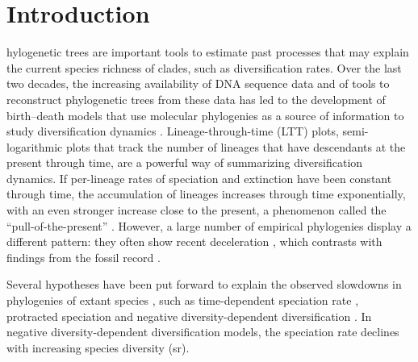 \clearpage
{ %
\renewcommand{\subsectionautorefname}{Appendix}
\section{Introduction}
\label{ch1::sec::intro}
hylogenetic trees are important tools to estimate past processes that may explain the current species richness of clades, such as diversification rates. Over the last two decades, the increasing availability of DNA sequence data and of tools to reconstruct phylogenetic trees from these data has led to the development of birth--death models that use molecular phylogenies as a source of information to study diversification dynamics \citep{nee_tempo_1992,purvis_phylogenetic_2008,quental_diversity_2010,etienne_diversity-dependence_2012}. Lineage-through-time (LTT) plots, semi-logarithmic plots that track the number of lineages that have descendants at the present through time, are a powerful way of summarizing diversification dynamics. If per-lineage rates of speciation and extinction have been constant through time, the accumulation of lineages increases through time exponentially, with an even stronger increase close to the present, a phenomenon called the ``pull-of-the-present'' \citep{nee_extinction_1994,kubo_inferring_1995}. However, a large number of empirical phylogenies display a different pattern: they often show recent deceleration \citep{purvis_phylogenetic_2008,phillimore_density-dependent_2008,moen_why_2014,aguilee_clade_2018}, which contrasts with findings from the fossil record \citep{etienne_diversity-dependence_2012,louca_why_2021}.

Several hypotheses have been put forward to explain the observed slowdowns in phylogenies of extant species \citep{moen_why_2014}, such as time-dependent speciation rate \citep{moen_why_2014}, protracted speciation \citep{etienne_prolonging_2012} and negative diversity-dependent diversification \citep{valentine_evolutionary_1974,sepkoski_kinetic_1978,etienne_diversity-dependence_2012}. In negative diversity-dependent diversification models, the speciation rate declines with increasing species diversity (\acrshort{sr}). 

}
